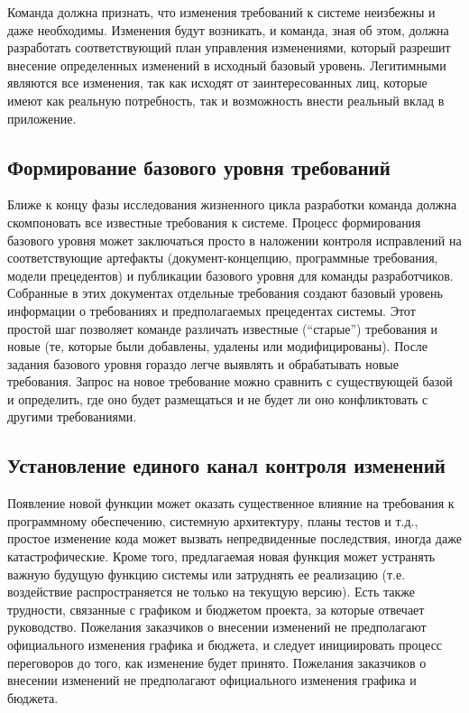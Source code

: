 \documentclass[a4paper,14pt]{extarticle}
\begin{document}
Команда должна признать, что изменения требований к системе неизбежны и даже
необходимы. Изменения будут возникать, и команда, зная об этом, должна
разработать соответствующий план управления изменениями, который разрешит
внесение определенных изменений в исходный базовый уровень. Легитимными являются
все изменения, так как исходят от заинтересованных лиц, которые имеют как
реальную потребность, так и возможность внести реальный вклад в приложение.

\subsection{Формирование базового уровня требований}

Ближе к концу фазы исследования жизненного цикла разработки команда должна
скомпоновать все известные требования к системе. Процесс формирования базового
уровня может заключаться просто в наложении контроля исправлений на
соответствующие артефакты (документ-концепцию, программные требования, модели
прецедентов) и публикации базового уровня для команды разработчиков. Собранные в
этих документах отдельные требования создают базовый уровень информации о
требованиях и предполагаемых прецедентах системы. Этот простой шаг позволяет
команде различать известные (\enquote{старые}) требования и новые (те, которые были
добавлены, удалены или модифицированы). После задания базового уровня гораздо
легче выявлять и обрабатывать новые требования. Запрос на новое требование можно
сравнить с существующей базой и определить, где оно будет размещаться и не будет
ли оно конфликтовать с другими требованиями.

\subsection{Установление единого канал контроля изменений}

Появление новой функции может оказать существенное влияние на требования к
программному обеспечению, системную архитектуру, планы тестов и т.д., простое
изменение кода может вызвать непредвиденные последствия, иногда даже
катастрофические. Кроме того, предлагаемая новая функция может устранять важную
будущую функцию системы или затруднять ее реализацию (т.е. воздействие
распространяется не только на текущую версию). Есть также трудности, связанные с
графиком и бюджетом проекта, за которые отвечает руководство. Пожелания
заказчиков о внесении изменений не предполагают официального изменения графика и
бюджета, и следует инициировать процесс переговоров до того, как изменение будет
принято. Пожелания заказчиков о внесении изменений не предполагают официального
изменения графика и бюджета.
\end{document}
